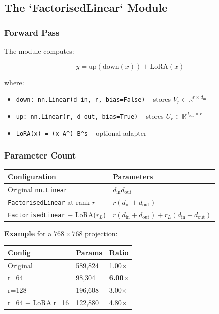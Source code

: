 \subsection{The `FactorisedLinear` Module}

\subsubsection{Forward Pass}

The module computes:

\[
y = \text{up}(\text{down}(x)) + \text{LoRA}(x)
\tag{4.2}
\]

where:

\begin{itemize}
\item \texttt{down: nn.Linear(d\_in, r, bias=False)} -- stores $V_r \in \mathbb{R}^{r \times d_\text{in}}$
\item \texttt{up: nn.Linear(r, d\_out, bias=True)} -- stores $U_r \in \mathbb{R}^{d_\text{out} \times r}$
\item \texttt{LoRA(x) = (x A^\top) B^\top \cdot s} -- optional adapter

\end{itemize}
\subsubsection{Parameter Count}

\begin{table}[H]
\centering
\small
\begin{tabular}{ll}
\toprule
\textbf{Configuration} & \textbf{Parameters} \\
\midrule
Original \texttt{nn.Linear} & $d_\text{in} d_\text{out}$ \\
\texttt{FactorisedLinear} at rank $r$ & $r(d_\text{in} + d_\text{out})$ \\
\texttt{FactorisedLinear} + LoRA($r_L$) & $r(d_\text{in} + d_\text{out}) + r_L(d_\text{in} + d_\text{out})$ \\
\bottomrule
\end{tabular}
\end{table}

\textbf{Example} for a $768 \times 768$ projection:

\begin{table}[H]
\centering
\small
\begin{tabular}{lll}
\toprule
\textbf{Config} & \textbf{Params} & \textbf{Ratio} \\
\midrule
Original & 589,824 & 1.00$\times$ \\
r=64 & 98,304 & \textbf{6.00$\times$} \\
r=128 & 196,608 & 3.00$\times$ \\
r=64 + LoRA r=16 & 122,880 & 4.80$\times$ \\
\bottomrule
\end{tabular}
\end{table}

